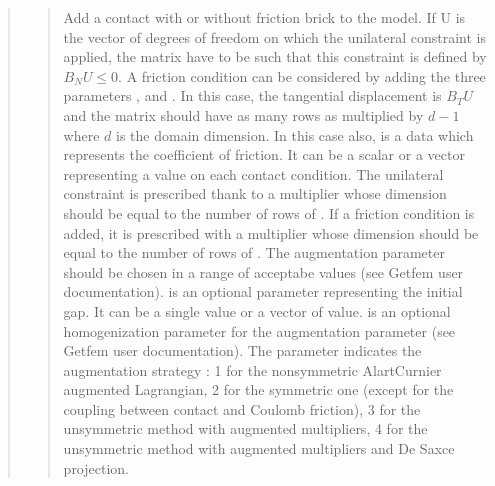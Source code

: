 \documentclass[a4paper,11pt,english]{sphinxmanual}
\begin{document}
\begin{quote}
\begin{quote}
Add a contact with or without friction brick to the model.
If U is the vector
of degrees of freedom on which the unilateral constraint is applied,
the matrix  have to be such that this constraint is defined by
\(B_N U \le 0\). A friction condition can be considered by adding
the three parameters ,  and .
In this case, the tangential displacement is \(B_T U\) and
the matrix  should have as many rows as  multiplied by
\(d-1\) where \(d\) is the domain dimension.
In this case also,  is a data which represents
the coefficient of friction. It can be a scalar or a vector representing a
value on each contact condition.  The unilateral constraint is prescribed
thank to a multiplier
 whose dimension should be equal to the number of rows of
. If a friction condition is added, it is prescribed with a
multiplier  whose dimension should be equal to the number
of rows of . The augmentation parameter  should be chosen in
a range of
acceptabe values (see Getfem user documentation).  is an
optional parameter representing the initial gap. It can be a single value
or a vector of value.  is an optional homogenization
parameter for the augmentation parameter
(see Getfem user documentation).  The parameter 
indicates the augmentation strategy : 1 for the non\sphinxhyphen{}symmetric
Alart\sphinxhyphen{}Curnier augmented Lagrangian, 2 for the symmetric one (except for
the coupling between contact and Coulomb friction), 3 for the
unsymmetric method with augmented multipliers, 4 for the unsymmetric
method with augmented multipliers and De Saxce projection.
\end{quote}


\end{quote}
\end{document}
